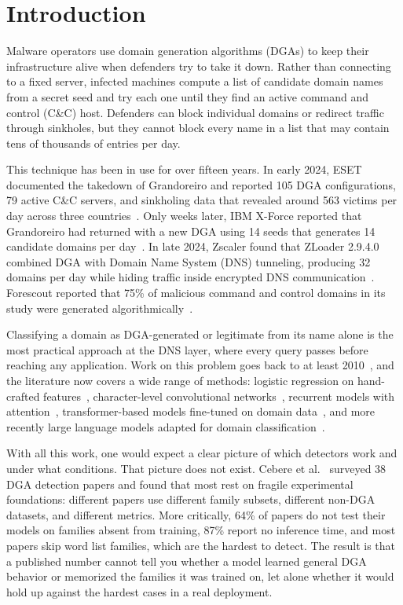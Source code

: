 \documentclass[conference]{IEEEtran}
\begin{document}
\section{Introduction}
\label{sec:introduction}

Malware operators use domain generation algorithms (DGAs) to keep their infrastructure alive when defenders try to take it down. Rather than connecting to a fixed server, infected machines compute a list of candidate domain names from a secret seed and try each one until they find an active command and control (C\&C) host. Defenders can block individual domains or redirect traffic through sinkholes, but they cannot block every name in a list that may contain tens of thousands of entries per day.

This technique has been in use for over fifteen years. In early 2024, ESET documented the takedown of Grandoreiro and reported 105 DGA configurations, 79 active C\&C servers, and sinkholing data that revealed around 563 victims per day across three countries~\cite{eset2024grandoreiro}. Only weeks later, IBM X-Force reported that Grandoreiro had returned with a new DGA using 14 seeds that generates 14 candidate domains per day~\cite{ibm2024grandoreiro}. In late 2024, Zscaler found that ZLoader 2.9.4.0 combined DGA with Domain Name System (DNS) tunneling, producing 32 domains per day while hiding traffic inside encrypted DNS communication~\cite{zscalerzloader2024}. Forescout reported that 75\% of malicious command and control domains in its study were generated algorithmically~\cite{forescout2025}.

Classifying a domain as DGA-generated or legitimate from its name alone is the most practical approach at the DNS layer, where every query passes before reaching any application. Work on this problem goes back to at least 2010~\cite{plohmann_dga, yadav2010detecting}, and the literature now covers a wide range of methods: logistic regression on hand-crafted features~\cite{Soleymani_LGic}, character-level convolutional networks~\cite{catania2019analysis}, recurrent models with attention~\cite{tuan2022detecting}, transformer-based models fine-tuned on domain data~\cite{mahdaouy2024domurls_bert, Dom-BERT}, and more recently large language models adapted for domain classification~\cite{la2024llms, alqahtani2025llmreview}.

With all this work, one would expect a clear picture of which detectors work and under what conditions. That picture does not exist. Cebere et al.~\cite{cebere2024down} surveyed 38 DGA detection papers and found that most rest on fragile experimental foundations: different papers use different family subsets, different non-DGA datasets, and different metrics. More critically, 64\% of papers do not test their models on families absent from training, 87\% report no inference time, and most papers skip word list families, which are the hardest to detect. The result is that a published number cannot tell you whether a model learned general DGA behavior or memorized the families it was trained on, let alone whether it would hold up against the hardest cases in a real deployment.
\end{document}
